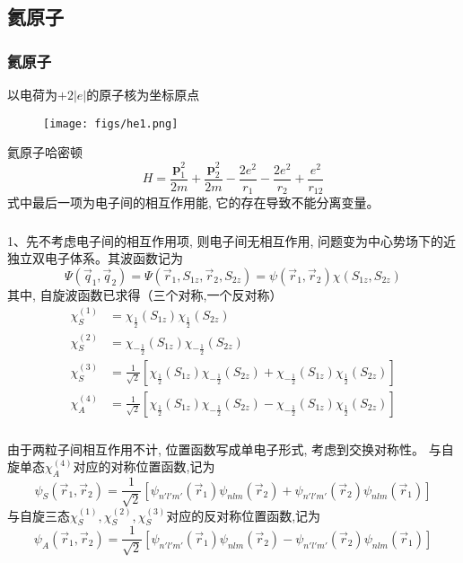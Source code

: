 \subsection{氦原子}
\begin{frame}[label=current]
  \frametitle{氦原子}
  以电荷为$+2\left\vert e \right\vert$的原子核为坐标原点
  \begin{figure}[htbp]
    \centering
    \texttt{[image: figs/he1.png]}
  \end{figure}
  氦原子哈密顿
  \[
  H=\frac{\mathbf{p}_1^2}{2 m}+\frac{\mathbf{p}_2^2}{2 m}-\frac{2 e^2}{r_1}-\frac{2 e^2}{r_2}+\frac{e^2}{r_{12}}
  \]
  式中最后一项为电子间的相互作用能, 它的存在导致不能分离变量。\\
\end{frame} 

\begin{frame}[label=current]
  \frametitle{}
  1、先不考虑电子间的相互作用项, 则电子间无相互作用, 问题变为中心势场下的近独立双电子体系。其波函数记为
  \[ \Psi(\vec{q}_1, \vec{q}_2) = \Psi(\vec{r}_1, S_{1z}, \vec{r}_2, S_{2z}) = \psi(\vec{r}_1, \vec{r}_2) \chi (S_{1z}, S_{2z})\]
其中, 自旋波函数已求得（三个对称,一个反对称）
  \[ 
    \begin{aligned}
      \chi ^{(1)} _S &= \chi _{ \frac{1}{2}} (S_{1z})\chi_{ \frac{1}{2}} (S_{2z})  \\ 
      \chi ^{(2)} _S &= \chi _{ -\frac{1}{2}} (S_{1z})\chi_{ -\frac{1}{2}} (S_{2z})  \\ 
      \chi ^{(3)} _S &= \frac{1}{\sqrt{2} }\left[\chi _{ \frac{1}{2}} (S_{1z})\chi_{ -\frac{1}{2}} (S_{2z})  + \chi _{ -\frac{1}{2}} (S_{1z})\chi_{\frac{1}{2}} (S_{2z})\right] \\ 
      \chi ^{(4)} _A &= \frac{1}{\sqrt{2} }\left[\chi _{ \frac{1}{2}} (S_{1z})\chi_{ -\frac{1}{2}} (S_{2z})  - \chi _{ -\frac{1}{2}} (S_{1z})\chi_{\frac{1}{2}} (S_{2z})\right] 
    \end{aligned}\]
\end{frame} 

\begin{frame}[label=current]
  \frametitle{}
由于两粒子间相互作用不计, 位置函数写成单电子形式, 考虑到交换对称性。 与自旋单态$\chi ^{(4)} _A$对应的对称位置函数,记为
$$
\psi _S \left(\vec{r}_1, \vec{r}_2\right)=\frac{1}{\sqrt{2}}\left[\psi_{n' l' m'}\left(\vec{r}_1\right) \psi_{n l m}\left(\vec{r}_2\right) + \psi_{n' l' m'}\left(\vec{r}_2\right) \psi_{n l m}\left(\vec{r}_1\right)\right]
$$
与自旋三态$\chi ^{(1)} _S, \chi ^{(2)} _S, \chi ^{(3)} _S$对应的反对称位置函数,记为
$$
\psi _A \left(\vec{r}_1, \vec{r}_2\right)=\frac{1}{\sqrt{2}}\left[\psi_{n' l' m'}\left(\vec{r}_1\right) \psi_{n l m}\left(\vec{r}_2\right) - \psi_{n' l' m'}\left(\vec{r}_2\right) \psi_{n l m}\left(\vec{r}_1\right)\right]
$$
\end{frame} 

